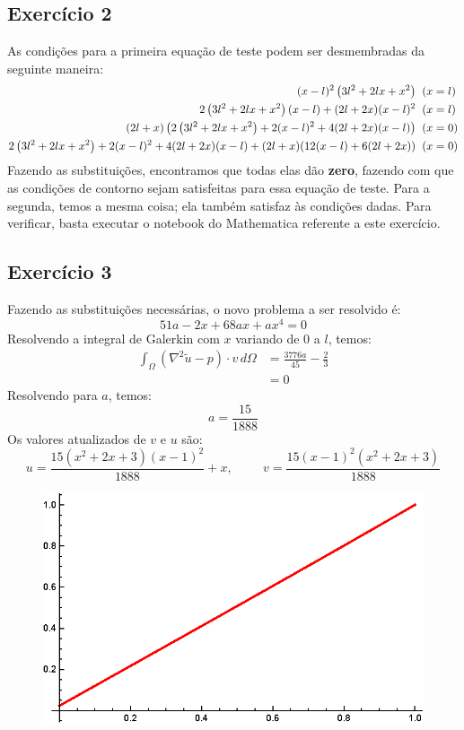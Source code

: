 \documentclass[10pt,a4paper]{article}
\begin{document}
	\subsection*{Exercício 2}
	As condições para a primeira equação de teste podem ser desmembradas da seguinte maneira:
	\begin{align*}
		(x-l)^2 \left(3 l^2+2 l x+x^2\right) & \hspace{0.2cm}(x=l)\\
		2 \left(3 l^2+2 l x+x^2\right) (x-l)+(2 l+2 x) (x-l)^2 & \hspace{0.2cm}(x=l)\\
		(2 l+x) \left(2 \left(3 l^2+2 l x+x^2\right)+2 (x-l)^2+4 (2 l+2 x) (x-l)\right) & \hspace{0.2cm}(x=0)\\
		2 \left(3 l^2+2 l x+x^2\right)+2 (x-l)^2+4 (2 l+2 x) (x-l)+(2 l+x) (12 (x-l)+6 (2 l+2 x)) & \hspace{0.2cm}(x=0)
	\end{align*}
	Fazendo as substituições, encontramos que todas elas dão \textbf{zero}, fazendo com que as condições de contorno sejam satisfeitas para essa equação de teste. Para a segunda, temos a mesma coisa; ela também satisfaz às condições dadas. Para verificar, basta executar o notebook do Mathematica referente a este exercício.
	
	\subsection*{Exercício 3}
	Fazendo as substituições necessárias, o novo problema a ser resolvido é:
	\[51 a - 2 x + 68 a x + a x^4 = 0\]
	Resolvendo a integral de Galerkin com $x$ variando de 0 a $l$, temos:
	\begin{align*}
		\int_\Omega \left(\nabla^2\tilde{u}-p\right)\cdot v\,d\Omega &= \frac{3776 a}{45}-\frac{2}{3}\\
		&= 0
	\end{align*}
	Resolvendo para $a$, temos:
	\[a=\frac{15}{1888}\]
	Os valores atualizados de $v$ e $u$ são:
	\[u = \frac{15 \left(x^2+2 x+3\right) (x-1)^2}{1888}+x, \hspace{1cm} v = \frac{15 (x-1)^2 \left(x^2+2 x+3\right)}{1888}\]
	
	\begin{figure}[h!]
    \centering
      \includegraphics[scale=1]{figures/exercicio3.eps}
	\end{figure}
	
\end{document}
